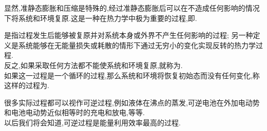 \documentclass{ctexart}
\begin{document}
\indent 显然,准静态膨胀和压缩是特殊的,经过准静态膨胀后可以在不造成任何影响的情况下将系统和环境复原.这是一种在热力学中极为重要的过程,即.
\begin{definition}[2A.4.2 可逆过程]
    是指过程发生后能够被复原并对系统本身或外界不产生任何影响的过程;%
    另一种定义是系统能够在无能量损失或耗散的情形下通过无穷小的变化实现反转的热力学过程.\\
    反之,如果采取任何方法都不能使系统和环境复原,就称为.\\
    如果这一过程是一个循环的过程,那么系统和环境将恢复初始态而没有任何变化,称这样的过程为.
\end{definition}
很多实际过程都可以视作可逆过程,例如液体在沸点的蒸发,可逆电池在外加电动势和电池电动势近似相等时的充电和放电,等等.\\
\indent 以后我们将会知道,可逆过程是能量利用效率最高的过程.
\end{document}
